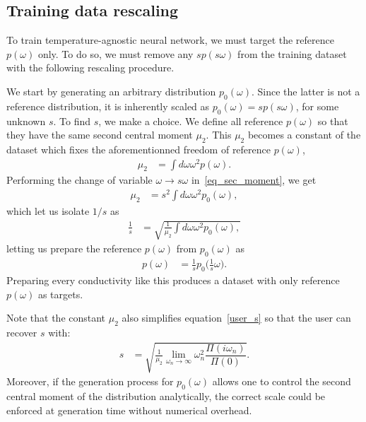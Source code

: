 \documentclass[notitlepage,11pt,nofootinbib]{revtex4-1}
\begin{document}
\subsection{Training data rescaling}
\label{section_data_rescaling}
To train temperature-agnostic neural network, we must target the reference $p(\omega)$ only. To do so, we must remove any $sp(s\omega)$ from the training dataset with the following rescaling procedure.

We start by generating an arbitrary distribution $p_0(\omega)$. Since the latter is not a reference distribution, it is inherently scaled as $p_0(\omega)=sp(s\omega)$, for some unknown $s$.
To find $s$, we make a choice. We define all reference $p(\omega)$ so that they have the same second central moment $\mu_2$. This $\mu_2$ becomes a constant of the dataset which fixes the aforementionned freedom of reference $p(\omega)$,
\begin{align}
\mu_2
&=
\int d\omega \omega^2 p(\omega).
\label{eq_sec_moment}
\end{align}
Performing the change of variable $\omega \rightarrow s\omega$ in~\eqref{eq_sec_moment}, we get
\begin{align}
\mu_2&=
s^2 \int d\omega \omega^2 p_0(\omega),
\end{align}
which let us isolate $1/s$ as
\begin{align}
\frac{1}{s}
&=
\sqrt{
\frac{1}{\mu_2}
\int d\omega \omega^2 p_0(\omega),
}
\end{align}
letting us prepare the reference $p(\omega)$ from $p_0(\omega)$ as
\begin{align}
p(\omega) 
&=
\frac{1}{s}p_0\big(\frac{1}{s}\omega\big).
\end{align}
Preparing every conductivity like this produces a dataset with only reference $p(\omega)$ as targets.

Note that the constant $\mu_2$ also simplifies equation~\eqref{user_s} so that the user can recover $s$ with:
\begin{align}
s
&=
\sqrt{
\frac{1}{\mu_2}
\lim_{\omega_n\rightarrow\infty}\omega_n^2
\dfrac{\Pi(i\omega_n)}{\Pi(0)}
}.
\label{eq_simplified_user_s}
\end{align}
Moreover, if the generation process for $p_0(\omega)$ allows one to control the second central moment of the distribution analytically, the correct scale could be enforced at generation time without numerical overhead.

\end{document}
